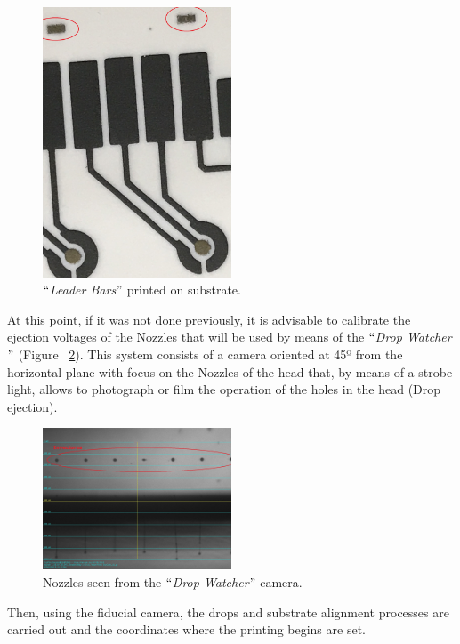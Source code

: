 \begin{figure}[H]
  \centering
    \includegraphics[width=0.5\textwidth]{Figures/Figura_Leader_Bar}
  \caption{$``$\textit{Leader Bars}$"$ printed on substrate.}
  \label{fig:Figura_Leader_Bar}
\end{figure}

At this point, if it was not done previously, it is advisable to calibrate the ejection voltages of the Nozzles that will be used by means of the $``$\textit{Drop Watcher}$"$ (Figure ~\ref{fig:Figura_nozzles}). This system consists of a camera oriented at 45º from the horizontal plane with focus on the Nozzles of the head that, by means of a strobe light, allows to photograph or film the operation of the holes in the head (Drop ejection).

\begin{figure}[H]
  \centering
    \includegraphics[width=0.5\textwidth]{Figures/Figura_nozzles}
  \caption{Nozzles seen from the $``$\textit{Drop Watcher}$"$ camera.}
  \label{fig:Figura_nozzles}
\end{figure}

Then, using the fiducial camera, the drops and substrate alignment processes are carried out and the coordinates where the printing begins are set.


